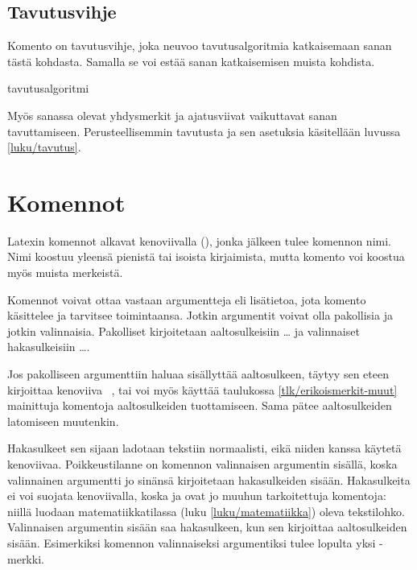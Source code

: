 \subsection{Tavutusvihje}

Komento \komentom{-} on tavutusvihje, joka neuvoo tavutusalgoritmia
katkaisemaan sanan tästä kohdasta. Samalla se voi estää sanan
katkaisemisen muista kohdista.

\begin{koodilohkosis}
tavutus\-algo\-ritmi
\end{koodilohkosis}

\noindent
Myös sanassa olevat yhdysmerkit ja ajatusviivat vaikuttavat sanan
tavuttamiseen. Perusteellisemmin tavutusta ja sen asetuksia käsitellään
luvussa \ref{luku/tavutus}.

\section{Komennot}
\label{luku/komennot}

Latexin komennot alkavat kenoviivalla (\koodi{\textbackslash}), jonka
jälkeen tulee komennon nimi. Nimi koostuu yleensä pienistä tai isoista
kirjaimista, mutta komento voi koostua myös muista merkeistä.

Komennot voivat ottaa vastaan argumentteja eli lisätietoa, jota komento
käsittelee ja tarvitsee toimintaansa. Jotkin argumentit voivat olla
pakollisia ja jotkin valinnaisia. Pakolliset kirjoitetaan
aaltosulkeisiin \koodi{\{}\ldots\koodi{\}} ja valinnaiset hakasulkeisiin
\koodi{[}\ldots\koodi{]}.

\begin{koodilohkosis}
\komento
{}
\end{koodilohkosis}

\noindent
Jos pakolliseen argumenttiin haluaa sisällyttää aaltosulkeen, täytyy sen
eteen kirjoittaa kenoviiva \komento{\{}~\komento{\}}, tai voi myös
käyttää taulukossa \ref{tlk/erikoismerkit-muut} mainittuja komentoja
aaltosulkeiden tuottamiseen. Sama pätee aaltosulkeiden latomiseen
muutenkin.

Hakasulkeet sen sijaan ladotaan tekstiin normaalisti, eikä niiden kanssa
käytetä kenoviivaa. Poikkeustilanne on komennon valinnaisen argumentin
sisällä, koska valinnainen argumentti jo sinänsä kirjoitetaan
hakasulkeiden sisään. Hakasulkeita ei voi suojata kenoviivalla, koska
\komento{[} ja \komento{]} ovat jo muuhun tarkoitettuja komentoja:
niillä luodaan matematiikkatilassa (luku \ref{luku/matematiikka}) oleva
tekstilohko. Valinnaisen argumentin sisään saa hakasulkeen, kun sen
kirjoittaa aaltosulkeiden sisään. Esimerkiksi komennon
\komentoargv{\{]\}} valinnaiseksi argumentiksi tulee
lopulta yksi \koodi{]}-merkki.

